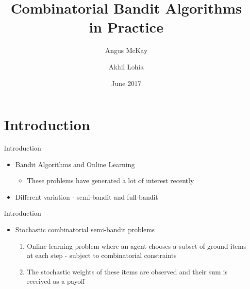 \documentclass[10pt]{beamer}
\title[Combinatorial Bandits]{Combinatorial Bandit Algorithms in Practice}
\author[Angus McKay, Akhil Lohia]{
			Angus McKay \and Akhil Lohia}
\date{June 2017}
\begin{document}
\begin{frame}
  \titlepage
\end{frame}



\section{Introduction}


\begin{frame}{Introduction}
	\begin{itemize}
		\item Bandit Algorithms and Online Learning
		\begin{itemize}
			\item These problems have generated a lot of interest recently
		\end{itemize}
		\item Different variation - semi-bandit and full-bandit
	\end{itemize}
\end{frame}




\begin{frame}{Introduction}
	\begin{itemize}
		\item Stochastic combinatorial semi-bandit problems
		\begin{enumerate}
			\item Online learning problem where an agent chooses a subset of ground items at each step - subject to combinatorial constraints
			\item The stochastic weights of these items are observed and their sum is received as a payoff
		\end{enumerate}
	\end{itemize}
\end{frame}
\end{document}
